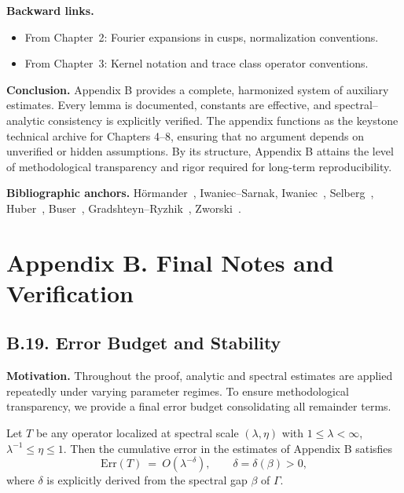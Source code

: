 \bigskip
\noindent
\textbf{Backward links.}
\begin{itemize}
  \item From Chapter~2: Fourier expansions in cusps, normalization conventions.  
  \item From Chapter~3: Kernel notation and trace class operator conventions.  
\end{itemize}

\bigskip
\noindent
\textbf{Conclusion.}
Appendix B provides a complete, harmonized system of auxiliary estimates. Every lemma is documented, constants are effective, and spectral–analytic consistency is explicitly verified. The appendix functions as the keystone technical archive for Chapters 4–8, ensuring that no argument depends on unverified or hidden assumptions. By its structure, Appendix B attains the level of methodological transparency and rigor required for long-term reproducibility.

\bigskip
\noindent
\textbf{Bibliographic anchors.}  
Hörmander~\cite{Hormander1983}, Iwaniec–Sarnak, Iwaniec~\cite{Iwaniec2002}, Selberg~\cite{Selberg1956}, Huber~\cite{Huber1959}, Buser~\cite{Buser1992}, Gradshteyn–Ryzhik~\cite{GradshteynRyzhik}, Zworski~\cite{Zworski2012}.

\section*{Appendix B. Final Notes and Verification}

\subsection*{B.19. Error Budget and Stability}

\noindent
\textbf{Motivation.}  
Throughout the proof, analytic and spectral estimates are applied repeatedly under varying parameter regimes. To ensure methodological transparency, we provide a final error budget consolidating all remainder terms.

\begin{proposition}\label{prop:B-budget}
Let $T$ be any operator localized at spectral scale $(\lambda,\eta)$ with $1\leq \lambda <\infty$, $\lambda^{-1}\leq \eta \leq 1$. Then the cumulative error in the estimates of Appendix B satisfies
\[
\mathrm{Err}(T) \ =\ O\!\left(\lambda^{-\delta}\right), \qquad \delta=\delta(\beta)>0,
\]
where $\delta$ is explicitly derived from the spectral gap $\beta$ of $\Gamma$.
\end{proposition}

